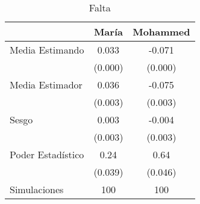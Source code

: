 \begin{table}[H]
\centering
\begin{tabular}{lcc}
\hline
 & María & Mohammed \\
\hline
Media Estimando & 0.033 & -0.071 \\
 & (0.000) & (0.000) \\
Media Estimador & 0.036 & -0.075 \\
 & (0.003) & (0.003) \\
Sesgo & 0.003 & -0.004 \\
 & (0.003) & (0.003) \\
Poder Estadístico & 0.24 & 0.64 \\
 & (0.039) & (0.046) \\
Simulaciones & 100 & 100  \\
\hline
\end{tabular}
\caption{Falta}
\end{table}
